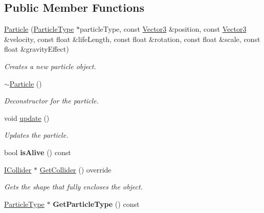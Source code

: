 \subsection*{Public Member Functions}
\begin{DoxyCompactItemize}
\item 
\hyperlink{class_flounder_1_1_particle_a35ce43438b08e611f3c9d7e6c5e60956}{Particle} (\hyperlink{class_flounder_1_1_particle_type}{Particle\+Type} $\ast$particle\+Type, const \hyperlink{class_flounder_1_1_vector3}{Vector3} \&position, const \hyperlink{class_flounder_1_1_vector3}{Vector3} \&velocity, const float \&life\+Length, const float \&rotation, const float \&scale, const float \&gravity\+Effect)
\begin{DoxyCompactList}\small\item\em Creates a new particle object. \end{DoxyCompactList}\item 
\hyperlink{class_flounder_1_1_particle_ac7c3d38470919432f731dced0b9cd829}{$\sim$\+Particle} ()
\begin{DoxyCompactList}\small\item\em Deconstructor for the particle. \end{DoxyCompactList}\item 
void \hyperlink{class_flounder_1_1_particle_a79c8b467791029cda2158655403741f0}{update} ()
\begin{DoxyCompactList}\small\item\em Updates the particle. \end{DoxyCompactList}\item 
\mbox{\label{class_flounder_1_1_particle_a124fde85e848d276f247ce9f06ea9488}} 
bool {\bfseries is\+Alive} () const
\item 
\hyperlink{class_flounder_1_1_i_collider}{I\+Collider} $\ast$ \hyperlink{class_flounder_1_1_particle_aa27a3dd7197f5ce881a45414d8c19551}{Get\+Collider} () override
\begin{DoxyCompactList}\small\item\em Gets the shape that fully encloses the object. \end{DoxyCompactList}\item 
\mbox{\label{class_flounder_1_1_particle_a02bb39c378d9434199e04f73a66e7871}} 
\hyperlink{class_flounder_1_1_particle_type}{Particle\+Type} $\ast$ {\bfseries Get\+Particle\+Type} () const
\item 

\end{DoxyCompactItemize}
